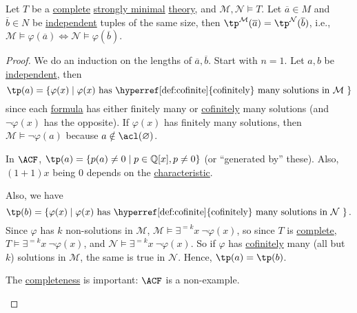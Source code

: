 \begin{lemma}
	Let \(T\) be a \hyperref[def:theory-complete]{complete} \hyperref[def:strongly-minimal]{strongly minimal} \hyperref[def:theory]{theory}, and \(\mathcal{M} , \mathcal{N} \models T\). Let \(\overline{a} \in M\) and \(\overline{b} \in N\) be \hyperref[def:independent]{independent} tuples of the same size, then \(\tp^{\mathcal{M} }(\overline{a} ) = \tp^{\mathcal{N} }(\overline{b} )\), i.e., \(\mathcal{M} \models \varphi (\overline{a} ) \iff \mathcal{N} \models \varphi (\overline{b} )\).
\end{lemma}
\begin{proof}
	We do an induction on the lengths of \(\overline{a} , \overline{b} \). Start with \(n = 1\). Let \(a, b\) be \hyperref[def:independent]{independent}, then
	\[
		\tp(a) = \left\{ \varphi (x) \mid \text{\(\varphi (x)\) has \hyperref[def:cofinite]{cofinitely} many solutions in \(\mathcal{M} \) }\right\}
	\]
	since each \hyperref[def:formula]{formula} has either finitely many or \hyperref[def:cofinite]{cofinitely} many solutions (and \(\lnot \varphi (x)\) has the opposite). If \(\varphi (x)\) has finitely many solutions, then \(\mathcal{M} \models \lnot \varphi (a)\) because \(a \notin \acl(\varnothing )\).

	\begin{eg}
		In \(\ACF\), \(\tp(a) = \left\{ p(a) \neq 0 \mid p\in \mathbb{Q} [x], p \neq 0 \right\} \) (or ``generated by'' these). Also, \((1 + 1) x\) being \(0\) depends on the \hyperref[def:characteristic]{characteristic}.
	\end{eg}

	Also, we have
	\[
		\tp(b) = \left\{ \varphi (x) \mid \text{\(\varphi (x)\) has \hyperref[def:cofinite]{cofinitely} many solutions in \(\mathcal{N} \) }\right\}.
	\]
	Since \(\varphi \) has \(k\) non-solutions in \(\mathcal{M} \), \(\mathcal{M} \models \exists ^{=k} x\ \lnot \varphi (x)\), so since \(T\) is \hyperref[def:theory-complete]{complete}, \(T \models \exists ^{=k} x\ \lnot \varphi (x)\), and \(\mathcal{N} \models \exists ^{=k} x\ \lnot \varphi (x)\). So if \(\varphi \) has \hyperref[def:cofinite]{cofinitely} many (all but \(k\)) solutions in \(\mathcal{M} \), the same is true in \(\mathcal{N} \). Hence, \(\tp(a) = \tp(b)\).

	\begin{eg}
		The \hyperref[def:theory-complete]{completeness} is important: \(\ACF\) is a non-example.
	\end{eg}


\end{proof}
